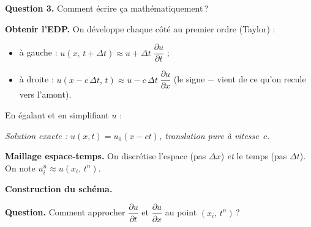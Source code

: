 \textbf{Question 3.}
\og Comment écrire ça mathématiquement\,?\fg{}


\textbf{Obtenir l'EDP.}
On développe chaque côté au premier ordre (Taylor) :
\begin{itemize}
  \item à gauche :
    $u(x,\,t+\Delta t)
    \approx u + \Delta t\;\dfrac{\partial u}{\partial t}$ ;
  \item à droite :
    $u(x - c\,\Delta t,\,t)
    \approx u - c\,\Delta t\;\dfrac{\partial u}{\partial x}$
    \quad (le signe $-$ vient de ce qu'on recule vers l'amont).
\end{itemize}

En égalant et en simplifiant $u$ :


\smallskip

\textit{Solution exacte :
$u(x,t) = u_0(x - ct)$,
translation pure à vitesse~$c$.}


\medskip

\textbf{Maillage espace-temps.}
On discrétise l'espace (pas $\Delta x$)
\emph{et} le temps (pas $\Delta t$).
On note $u_i^n \approx u(x_i,\,t^n)$.

\esquisse[5cm]


\medskip

\textbf{Construction du schéma.}

\textbf{Question.}
Comment approcher $\dfrac{\partial u}{\partial t}$
et $\dfrac{\partial u}{\partial x}$
au point $(x_i,\,t^n)$\,?


